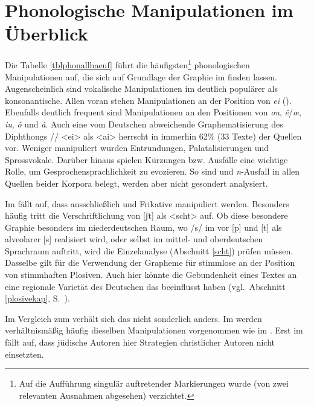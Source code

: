 \section{Phonologische Manipulationen im Überblick}\label{phonalles} 
\largerpage
Die Tabelle \ref{tblphonallhaeuf} führt die häufigsten\footnote{Auf die Aufführung singulär auftretender Markierungen wurde (von zwei relevanten Ausnahmen abgesehen) verzichtet.} phonologischen Manipulationen auf, die sich auf Grundlage der Graphie im  finden lassen. Augenscheinlich sind vokalische Manipulationen im  deutlich populärer als konsonantische. Allen voran stehen Manipulationen an der Position von {\mhd} \textit{ei} (). Ebenfalls deutlich frequent sind Manipulationen an den Positionen von {\mhd} \textit{ou}, \textit{ê}/\textit{œ}, \textit{iu}, \textit{ô} und \textit{â}. Auch eine vom Deutschen abweichende Graphematisierung des Diphthongs  // <ei> als <ai> herrscht in immerhin 62\% (33 Texte) der Quellen vor. Weniger manipuliert wurden Entrundungen, Palatalisierungen und Sprossvokale. Darüber hinaus spielen Kürzungen bzw. Ausfälle eine wichtige Rolle, um Gesprochensprachlichkeit zu evozieren. So sind  und \textit{n}-Ausfall in allen Quellen beider Korpora belegt, werden aber nicht gesondert analysiert.

Im  fällt auf, dass ausschließlich  und Frikative manipuliert werden. Besonders häufig tritt die Verschriftlichung von [ʃt] als <scht> auf. Ob diese besondere Graphie besonders im niederdeutschen Raum, wo /s/ im  vor [p] und [t] als alveolarer  [s]  realisiert wird, oder selbst im mittel- und oberdeutschen Sprachraum auftritt, wird die Einzelanalyse (Abschnitt \ref{scht}) prüfen müssen. Dasselbe gilt für die Verwendung der Grapheme für stimmlose  an der Position von stimmhaften Plosiven. Auch hier könnte die  Gebundenheit eines Textes an eine regionale Varietät des Deutschen das \hai{{\LiJi}} beeinflusst haben (vgl.\, Abschnitt \ref{plosivekap}, S.\, \pageref{plosivekap}). 
 
 Im Vergleich zum  verhält sich das  nicht sonderlich anders. Im  werden verhältnismäßig häufig dieselben Manipulationen vorgenommen wie im . Erst im  fällt auf, dass jüdische Autoren hier Strategien christlicher Autoren nicht einsetzten. 


